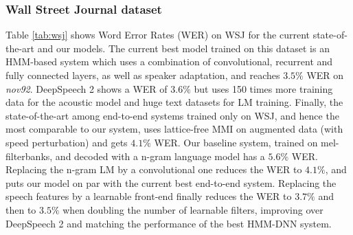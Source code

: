 \documentclass[a4paper]{article}
\begin{document}
\subsubsection{Wall Street Journal dataset}
Table \ref{tab:wsj} shows Word Error Rates (WER) on WSJ for the current state-of-the-art and our models. The current best model trained on this dataset is an HMM-based system which uses a combination of convolutional, recurrent and fully connected layers, as well as speaker adaptation, and reaches $3.5\%$ WER on \textit{nov92}. DeepSpeech 2 shows a WER of $3.6\%$ but uses 150 times more training data for the acoustic model and huge text datasets for LM training. Finally, the state-of-the-art among end-to-end systems trained only on WSJ, and hence the most comparable to our system, uses lattice-free MMI on augmented data (with speed perturbation) and gets $4.1\%$ WER. Our baseline system, trained on mel-filterbanks, and decoded with a n-gram language model has a $5.6\%$ WER. Replacing the n-gram LM by a convolutional one reduces the WER to $4.1\%$, and puts our model on par with the current best end-to-end system. Replacing the speech features by a learnable front-end finally reduces the WER to $3.7\%$ and then to $3.5\%$ when doubling the number of learnable filters, improving over DeepSpeech 2 and matching the performance of the best HMM-DNN system.
\end{document}
